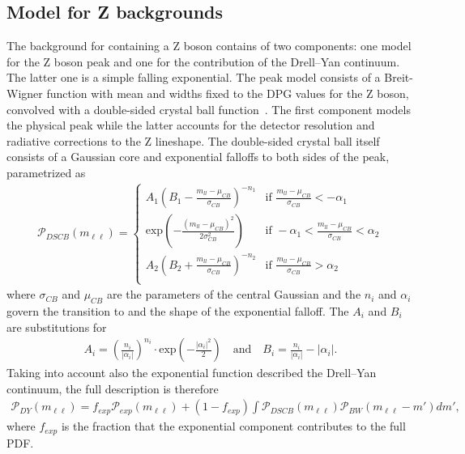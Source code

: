 \subsection{Model for Z backgrounds}
The background for containing a Z boson contains of two components: one model for the Z boson peak and one for the contribution of the Drell--Yan continuum. The latter one is a simple falling exponential. The peak model consists of a Breit-Wigner function with mean and widths fixed to the DPG values for the Z boson, convolved with a double-sided crystal ball function~\cite{Crystal}. The first component models the physical peak while the latter accounts for the detector resolution and radiative corrections to the Z lineshape. The double-sided crystal ball itself consists of a Gaussian core and exponential falloffs to both sides of the peak, parametrized as
\begin{eqnarray*}
\mathcal{P}_{DSCB}(m_{\ell\ell}) = \begin{cases} A_{1} (B_{1}-\frac{m_{ll}-\mu_{CB}}{\sigma_{CB}})^{-n_{1}} &\mbox{if } \frac{m_{ll}-\mu_{CB}}{\sigma_{CB}}<-\alpha_{1} \\
\textrm{exp}\left(-\frac{(m_{ll}-\mu_{CB})^2}{2\sigma_{CB}^2}\right) &\mbox{if } -\alpha_{1}<\frac{m_{ll}-\mu_{CB}}{\sigma_{CB}}<\alpha_{2} \\
A_{2} (B_{2}+\frac{m_{ll}-\mu_{CB}}{\sigma_{CB}})^{-n_{2}} &\mbox{if } \frac{m_{ll}-\mu_{CB}}{\sigma_{CB}}>\alpha_{2} \\
\end{cases}
\end{eqnarray*}
where $\sigma_{CB}$ and $\mu_{CB}$ are the parameters of the central Gaussian and the $n_i$ and $\alpha_i$ govern the transition to and the shape of the exponential falloff. The $A_i$ and $B_i$ are substitutions for
\begin{eqnarray*}
A_{i} = \left(\frac{n_{i}}{|\alpha_{i}|}\right)^{n_{i}} \cdot \textrm{exp}\left(-\frac{|\alpha_{i}|^2}{2}\right) \quad \textrm{and}\quad B_{i} = \frac{n_{i}}{|\alpha_{i}|}-|\alpha_{i}| .
\end{eqnarray*}
Taking into account also the exponential function described the Drell--Yan continuum, the full description is therefore 
\begin{eqnarray*}
\mathcal{P}_{DY} (m_{\ell\ell}) = f_{exp}\mathcal{P}_{exp}(m_{\ell\ell})+(1-f_{exp})\int \mathcal{P}_{DSCB}(m_{\ell\ell})\mathcal{P}_{BW}(m_{\ell\ell}-m') dm',
\end{eqnarray*}
where $f_{exp}$ is the fraction that the exponential component contributes to the full PDF. 

